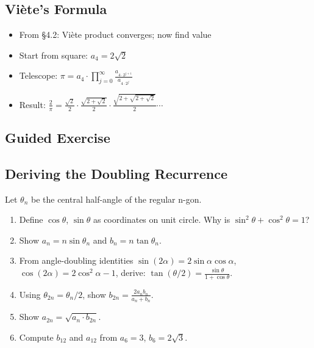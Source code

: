 \documentclass[
  10pt,
  letterpaper,
]{scrbook}
\providecommand{\tightlist}{%
  \setlength{\itemsep}{0pt}\setlength{\parskip}{0pt}}
\begin{document}
\subsection{Viète's Formula}\label{viuxe8tes-formula}

\begin{itemize}
\tightlist
\item
  From §4.2: Viète product converges; now find value
\item
  Start from square: \(a_4 = 2\sqrt{2}\)
\item
  Telescope:
  \(\pi = a_4 \cdot \prod_{j=0}^{\infty} \frac{a_{4 \cdot 2^{j+1}}}{a_{4 \cdot 2^j}}\)
\item
  Result:
  \(\frac{2}{\pi} = \frac{\sqrt{2}}{2} \cdot \frac{\sqrt{2+\sqrt{2}}}{2} \cdot \frac{\sqrt{2+\sqrt{2+\sqrt{2}}}}{2} \cdots\)
\end{itemize}

\subsection{Guided Exercise}\label{guided-exercise-6}

\subsection{Deriving the Doubling
Recurrence}\label{deriving-the-doubling-recurrence}

Let \(\theta_n\) be the central half-angle of the regular n-gon.

\begin{enumerate}
\def\labelenumi{(\alph{enumi})}
\item
  Define \(\cos\theta\), \(\sin\theta\) as coordinates on unit circle.
  Why is \(\sin^2\theta + \cos^2\theta = 1\)?
\item
  Show \(a_n = n\sin\theta_n\) and \(b_n = n\tan\theta_n\).
\item
  From angle-doubling identities
  \(\sin(2\alpha) = 2\sin\alpha\cos\alpha\),
  \(\cos(2\alpha) = 2\cos^2\alpha - 1\), derive:
  \(\tan(\theta/2) = \frac{\sin\theta}{1 + \cos\theta}\).
\item
  Using \(\theta_{2n} = \theta_n/2\), show
  \(b_{2n} = \frac{2a_n b_n}{a_n + b_n}\).
\item
  Show \(a_{2n} = \sqrt{a_n \cdot b_{2n}}\).
\item
  Compute \(b_{12}\) and \(a_{12}\) from \(a_6 = 3\),
  \(b_6 = 2\sqrt{3}\).
\end{enumerate}
\end{document}
